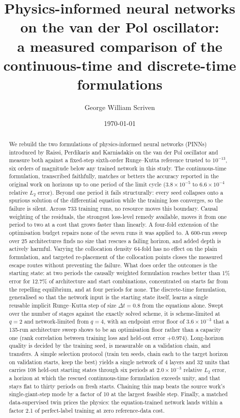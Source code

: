 \documentclass[11pt,a4paper]{article}
\title{Physics-informed neural networks on the van der Pol oscillator:\\
a measured comparison of the continuous-time and discrete-time formulations}
\author{George William Scriven}
\date{\today}
\begin{document}
\maketitle

\begin{abstract}
We rebuild the two formulations of physics-informed neural networks (PINNs)
introduced by Raissi, Perdikaris and Karniadakis on the van der Pol
oscillator and measure both against a fixed-step sixth-order Runge--Kutta
reference trusted to $10^{-13}$, six orders of magnitude below any trained
network in this study. The continuous-time formulation, transcribed
faithfully, matches or betters the accuracy reported in the original work
on horizons up to one period of the limit cycle ($3.8\times10^{-5}$ to
$6.6\times10^{-4}$ relative $L_2$ error). Beyond one period it fails
structurally: every seed collapses onto a spurious solution of the
differential equation while the training loss converges, so the failure is
silent. Across 733 training runs, no resource moves this boundary. Causal
weighting of the residuals, the strongest loss-level remedy available,
moves it from one period to two at a cost that grows faster than linearly.
A four-fold extension of the optimisation budget repairs none of the seven
runs it was applied to. A 600-run sweep over 25 architectures finds no
size that rescues a failing horizon, and added depth is actively harmful.
Varying the collocation density 64-fold has no effect on the plain
formulation, and targeted re-placement of the collocation points closes
the measured escape routes without preventing the failure. What does order
the outcomes is the starting state: at two periods the causally weighted
formulation reaches better than 1\% error for 12.7\% of architecture and
start combinations, concentrated on starts far from the repelling
equilibrium, and at four periods for none. The discrete-time formulation,
generalised so that the network input is the starting state itself, learns
a single reusable implicit Runge--Kutta step of size $\Delta t = 0.8$ from
the equations alone. Swept over the number of stages against the exactly
solved scheme, it is scheme-limited at $q=2$ and network-limited from
$q=4$, with an endpoint error floor of $3.6\times10^{-3}$ that a 135-run
architecture sweep shows to be an optimisation floor rather than a
capacity one (rank correlation between training loss and held-out error
$+0.974$). Long-horizon quality is decided by the training seed, is
measurable on a validation chain, and transfers. A simple selection
protocol (train ten seeds, chain each to the target horizon on validation
starts, keep the best) yields a single network of 4 layers and 32 units
that carries 108 held-out starting states through six periods at
$2.0\times10^{-3}$ relative $L_2$ error, a horizon at which the rescued
continuous-time formulation exceeds unity, and that stays flat to thirty
periods on fresh starts. Chaining this map beats the source work's
single-giant-step mode by a factor of 10 at the largest feasible step.
Finally, a matched data-supervised twin prices the physics: the
equation-trained network lands within a factor 2.1 of perfect-label
training at zero reference-data cost.
\end{abstract}
\end{document}
